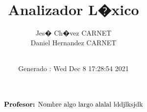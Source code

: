 \documentclass[letterpaper,twoside,12pt]{article}
\title{Analizador L�xico}
\date {Generado : Wed Dec  8 17:28:54 2021
}\author{Jes� Ch�vez CARNET \\  Daniel Hernandez CARNET \\ \\}
\begin{document}
\begin{titlepage}
\maketitle
\sffamily
\begin{align*}
\text{\textbf{Profesor:} Nombre algo largo alalal lddjlksjdk} \\ 
\end{align*}
\end{titlepage}
\end{document}
